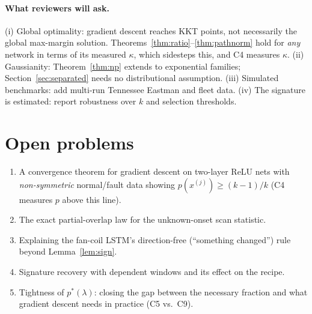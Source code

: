 \documentclass[11pt]{article}
\theoremstyle{definition}
\theoremstyle{remark}
\newcommand{\1}{\mathbf{1}}
\begin{document}
\paragraph{What reviewers will ask.} (i) Global optimality: gradient descent reaches KKT points, not necessarily the global max-margin solution. Theorems~\ref{thm:ratio}--\ref{thm:pathnorm} hold for \emph{any} network in terms of its measured $\kappa$, which sidesteps this, and C4 measures $\kappa$. (ii) Gaussianity: Theorem~\ref{thm:np} extends to exponential families; Section~\ref{sec:separated} needs no distributional assumption. (iii) Simulated benchmarks: add multi-run Tennessee Eastman and fleet data. (iv) The signature is estimated: report robustness over $k$ and selection thresholds.

\section{Open problems}\label{sec:open}
\begin{enumerate}[leftmargin=*]
\item A convergence theorem for gradient descent on two-layer ReLU nets with \emph{non-symmetric} normal/fault data showing $p(x^{(j)})\ge(k-1)/k$ (C4 measures $p$ above this line).
\item The exact partial-overlap law for the unknown-onset scan statistic.
\item Explaining the fan-coil LSTM's direction-free (``something changed'') rule beyond Lemma~\ref{lem:sign}.
\item Signature recovery with dependent windows and its effect on the recipe.
\item Tightness of $p^*(\lambda)$: closing the gap between the necessary fraction and what gradient descent needs in practice (C5 vs.\ C9).
\end{enumerate}
\end{document}
